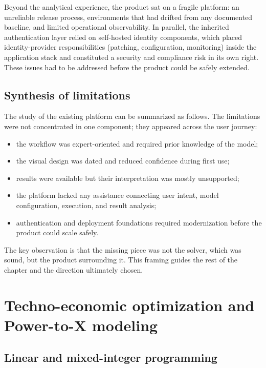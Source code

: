 Beyond the analytical experience, the product sat on a fragile platform: an
unreliable release process, environments that had drifted from any documented
baseline, and limited operational observability. In parallel, the inherited
authentication layer relied on self-hosted identity components, which placed
identity-provider responsibilities (patching, configuration, monitoring) inside
the application stack and constituted a security and compliance risk in its own
right. These issues had to be addressed before the product could be safely
extended.

\subsection{Synthesis of limitations}

The study of the existing platform can be summarized as follows. The limitations
were not concentrated in one component; they appeared across the user journey:

\begin{itemize}
  \item the workflow was expert-oriented and required prior knowledge of the
    model;
  \item the visual design was dated and reduced confidence during first use;
  \item results were available but their interpretation was mostly unsupported;
  \item the platform lacked any assistance connecting user intent, model
    configuration, execution, and result analysis;
  \item authentication and deployment foundations required modernization before
    the product could scale safely.
\end{itemize}

The key observation is that the missing piece was not the solver, which was
sound, but the product surrounding it. This framing guides the rest of the
chapter and the direction ultimately chosen.

\section{Techno-economic optimization and Power-to-X modeling}
\label{sec:opt-foundations}

\subsection{Linear and mixed-integer programming}

